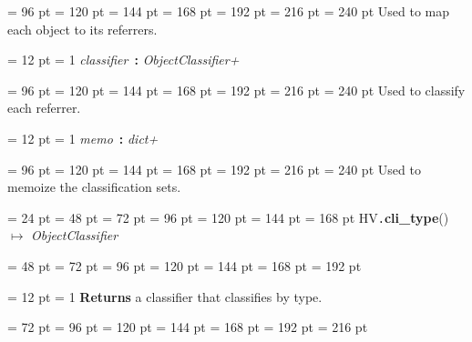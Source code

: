 {{{{{{{{\par \noindent  \leftskip = 96 pt  \leftmargini = 120 pt  \leftmarginii = 144 pt  \leftmarginiii = 168 pt  \leftmarginiv = 192 pt  \leftmarginv = 216 pt  \leftmarginvi = 240 pt  Used to map each object to its referrers.\par}
{\par \pagebreak[3.000000] \noindent \hangindent = 12 pt \hangafter = 1 
{\em classifier\/}~{\bf :}  {\em ObjectClassifier+\/}\par}
{\par \noindent  \leftskip = 96 pt  \leftmargini = 120 pt  \leftmarginii = 144 pt  \leftmarginiii = 168 pt  \leftmarginiv = 192 pt  \leftmarginv = 216 pt  \leftmarginvi = 240 pt  Used to classify each referrer.\par}
{\par \pagebreak[3.000000] \noindent \hangindent = 12 pt \hangafter = 1 
{\em memo\/}~{\bf :}  {\em dict+\/}\par}
{\par \noindent  \leftskip = 96 pt  \leftmargini = 120 pt  \leftmarginii = 144 pt  \leftmarginiii = 168 pt  \leftmarginiv = 192 pt  \leftmarginv = 216 pt  \leftmarginvi = 240 pt  Used to memoize the classification sets.
\par}
\par}
\par}
\par}
\par}
\par}
\par}
{\par \noindent  \leftskip = 24 pt  \leftmargini = 48 pt  \leftmarginii = 72 pt  \leftmarginiii = 96 pt  \leftmarginiv = 120 pt  \leftmarginv = 144 pt  \leftmarginvi = 168 pt HV{\tt .\/}{\bf {\large {\bf cli{\_}type\/}}\/}() \(\mapsto \)  {\em ObjectClassifier\/}{\par \noindent
{\par \noindent  \leftskip = 48 pt  \leftmargini = 72 pt  \leftmarginii = 96 pt  \leftmarginiii = 120 pt  \leftmarginiv = 144 pt  \leftmarginv = 168 pt  \leftmarginvi = 192 pt {\par \noindent
{\par \pagebreak[3.100000] \noindent \hangindent = 12 pt \hangafter = 1 
{\bf Returns \/} a classifier that classifies by type.\par}
{\par \noindent  \leftskip = 72 pt  \leftmargini = 96 pt  \leftmarginii = 120 pt  \leftmarginiii = 144 pt  \leftmarginiv = 168 pt  \leftmarginv = 192 pt  \leftmarginvi = 216 pt 
}}}}}}
